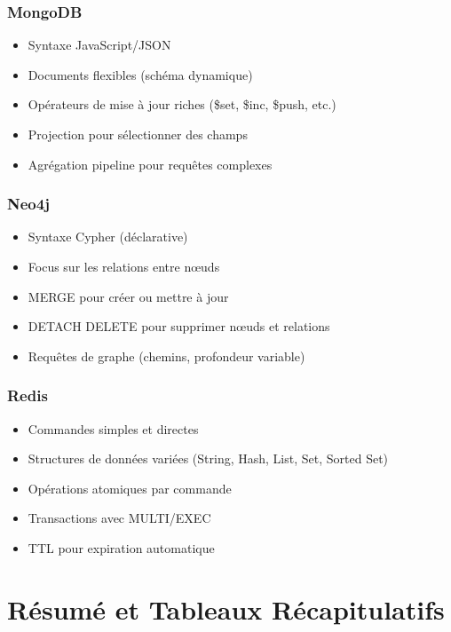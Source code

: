 \documentclass[11pt,a4paper]{article}
\begin{document}
\subsubsection{MongoDB}

\begin{itemize}
    \item Syntaxe JavaScript/JSON
    \item Documents flexibles (schéma dynamique)
    \item Opérateurs de mise à jour riches (\$set, \$inc, \$push, etc.)
    \item Projection pour sélectionner des champs
    \item Agrégation pipeline pour requêtes complexes
\end{itemize}

\subsubsection{Neo4j}

\begin{itemize}
    \item Syntaxe Cypher (déclarative)
    \item Focus sur les relations entre nœuds
    \item MERGE pour créer ou mettre à jour
    \item DETACH DELETE pour supprimer nœuds et relations
    \item Requêtes de graphe (chemins, profondeur variable)
\end{itemize}

\subsubsection{Redis}

\begin{itemize}
    \item Commandes simples et directes
    \item Structures de données variées (String, Hash, List, Set, Sorted Set)
    \item Opérations atomiques par commande
    \item Transactions avec MULTI/EXEC
    \item TTL pour expiration automatique
\end{itemize}

\newpage

\section{Résumé et Tableaux Récapitulatifs}
\end{document}
